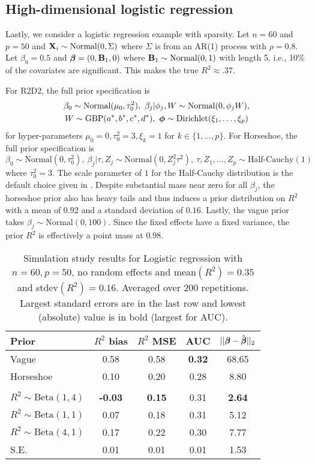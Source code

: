 \documentclass[12pt]{article}
\begin{document}
\subsection{High-dimensional logistic regression}
Lastly, we consider a logistic regression example with sparsity. Let $n=60$ and $p=50$ and $\mbox{\bf X}_i\sim\mbox{Normal}(0,\Sigma)$ where $\Sigma$ is from an AR(1) process with $\rho=0.8$. Let $\beta_0=0.5$ and $\mbox{\boldmath $\beta$}=(0, {\bf B}_1, 0)$ where ${\bf B}_1\sim\mbox{Normal}(0,1)$ with length 5, i.e., 10\% of the covariates are significant. This makes the true $R^2\approx .37$.

For R2D2, the full prior specification is
\begin{multline}
       \beta_0\sim\mbox{Normal}(\mu_0,\tau_0^2),\
       \beta_j|\phi_j,W\sim\mbox{Normal}(0, \phi_jW),\\ W\sim\mbox{GBP}(a^*, b^*, c^*, d^*),\ \bphi\sim\mbox{Dirichlet}(\xi_1,\dots,\xi_p)
\end{multline}
for hyper-parameters $\mu_0=0,\tau^2_0=3,\xi_k=1$ for $k\in\{1,\dots,p\}$. For Horseshoe, the full prior specification is
\begin{equation}
       \beta_0\sim\mbox{Normal}(0,\tau_0^2),\        \beta_j|\tau,Z_j\sim\mbox{Normal}(0, Z_j^2\tau^2),\ \tau, Z_1,\dots,Z_p\sim\mbox{Half-Cauchy}(1)
\end{equation}
where $\tau_0^2=3$. The scale parameter of $1$ for the Half-Cauchy distribution is the default choice given in \cite{carvalho2009handling}. Despite substantial mass near zero for all $\beta_j$, the horseshoe prior also has heavy tails and thus induces a prior distribution on $R^2$ with a mean of $0.92$ and a standard deviation of $0.16$. Lastly, the vague prior takes $\beta_j\sim\mbox{Normal}(0,100)$. Since the fixed effects have a fixed variance, the prior $R^2$ is effectively a point mass at $0.98$.

\begin{table}
    \centering
      \begin{tabular}{l|cccc}
        Prior & $R^2$ bias & $R^2$ MSE & AUC & $||\mbox{\boldmath $\beta$}-\hat{\mbox{\boldmath $\beta$}}||_2$ \\\hline
        Vague & 0.58 &0.58 &{\bf 0.32} &68.65\\
        Horseshoe &0.10 &0.20 &0.28 &8.80  \\
        &\vspace{-10pt}\\
        $R^2\sim\mbox{Beta}(1,4)$&{\bf -0.03} &{\bf 0.15} &0.31 &{\bf 2.64}\\
        $R^2\sim\mbox{Beta}(1,1)$&0.07 & 0.18 &0.31 &5.12 \\
        $R^2\sim\mbox{Beta}(4,1)$&0.17 &0.22 &0.30 &7.77 \\\hline
        S.E. & 0.01 & 0.01 & 0.01 & 1.53
    \end{tabular}
    \caption{Simulation study results for Logistic regression with $n=60, p=50$, no random effects and mean$(R^2)=0.35$ and stdev$(R^2)=0.16$. Averaged over 200 repetitions. Largest standard errors are in the last row and lowest (absolute) value is in bold (largest for AUC).}
    \label{tab:LogitSim1}
\end{table}
\end{document}
